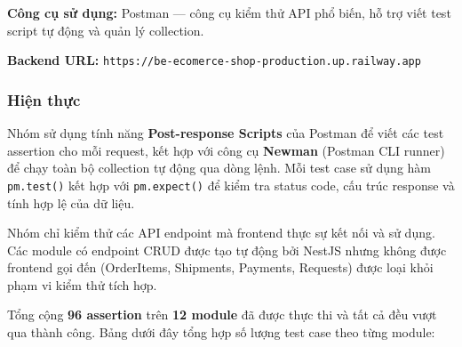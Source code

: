 \textbf{Công cụ sử dụng:} Postman — công cụ kiểm thử API phổ biến, hỗ trợ viết test script tự động và quản lý collection.

\textbf{Backend URL:} \texttt{https://be-ecomerce-shop-production.up.railway.app}

\subsubsection{Hiện thực}

Nhóm sử dụng tính năng \textbf{Post-response Scripts} của Postman để viết các test assertion cho mỗi request, kết hợp với công cụ \textbf{Newman} (Postman CLI runner) để chạy toàn bộ collection tự động qua dòng lệnh. Mỗi test case sử dụng hàm \texttt{pm.test()} kết hợp với \texttt{pm.expect()} để kiểm tra status code, cấu trúc response và tính hợp lệ của dữ liệu.

Nhóm chỉ kiểm thử các API endpoint mà frontend thực sự kết nối và sử dụng. Các module có endpoint CRUD được tạo tự động bởi NestJS nhưng không được frontend gọi đến (OrderItems, Shipments, Payments, Requests) được loại khỏi phạm vi kiểm thử tích hợp.

Tổng cộng \textbf{96 assertion} trên \textbf{12 module} đã được thực thi và tất cả đều vượt qua thành công. Bảng dưới đây tổng hợp số lượng test case theo từng module:

